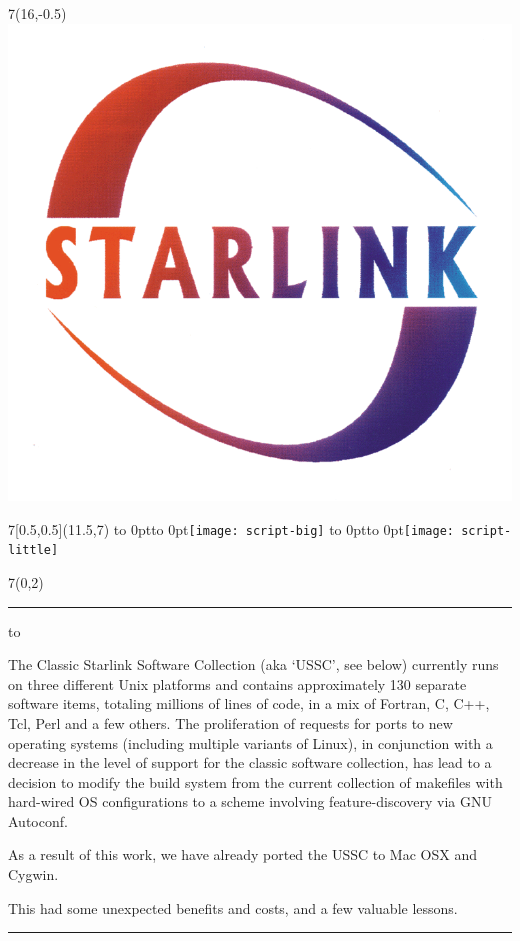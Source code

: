 \documentclass[a0,portrait]{a0poster-ng}
\def\RHead#1{\noindent\hbox to \hsize{\hfil{\LARGE\color{DarkBlue} #1\par}}\bigskip}
\let\Head\RHead
\begin{document}
\begin{textblock}{7}(16,-0.5)
\includegraphics{starlink_logo}
\end{textblock}

\begin{textblock}{7}[0.5,0.5](11.5,7)
\vbox to 0pt{\vss\hbox to 0pt{\hss\texttt{[image: script-big]}\hss}\vss}%
\vbox to 0pt{\vss\hbox to 0pt{\hss\texttt{[image: script-little]}\hss}\vss}%
\end{textblock}



\begin{textblock}{7}(0,2)
\hrule\medskip

\Head{Summary}

\slshape

The Classic Starlink Software Collection (aka `USSC', see below)
currently runs 
on three different Unix platforms and contains approximately 130 separate
software items, totaling millions of lines of code, in a mix of
Fortran, C, C++, Tcl, Perl and a few others. The proliferation of requests
for ports to
new operating systems (including multiple variants of Linux), in
conjunction with a decrease in the level of support for the classic
software collection, has lead to a decision to modify the build system
from the current collection of makefiles with hard-wired OS
configurations to a scheme involving feature-discovery via GNU
Autoconf.

As a result of this work, we have already ported the USSC to Mac OSX
and Cygwin. 

This had some unexpected benefits and costs, and a few valuable lessons.

\bigskip
\hrule
\end{textblock}
\end{document}
